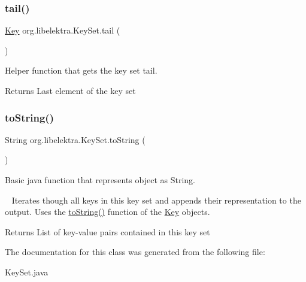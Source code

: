 \subsubsection{\texorpdfstring{tail()}{tail()}}
{\footnotesize\ttfamily \hyperlink{classorg_1_1libelektra_1_1Key}{Key} org.\+libelektra.\+Key\+Set.\+tail (\begin{DoxyParamCaption}{ }\end{DoxyParamCaption})\hspace{0.3cm}{\ttfamily [inline]}}



Helper function that gets the key set tail. 

\begin{DoxyReturn}{Returns}
Last element of the key set 
\end{DoxyReturn}
\mbox{\label{classorg_1_1libelektra_1_1KeySet_a9c1e2918acce8c7cda5be406989c87af}} 
\subsubsection{\texorpdfstring{to\+String()}{toString()}}
{\footnotesize\ttfamily String org.\+libelektra.\+Key\+Set.\+to\+String (\begin{DoxyParamCaption}{ }\end{DoxyParamCaption})\hspace{0.3cm}{\ttfamily [inline]}}



Basic java function that represents object as String. 

~\newline
 Iterates though all keys in this key set and appends their representation to the output. Uses the \hyperlink{classorg_1_1libelektra_1_1KeySet_a9c1e2918acce8c7cda5be406989c87af}{to\+String()} function of the \hyperlink{classorg_1_1libelektra_1_1Key}{Key} objects.

\begin{DoxyReturn}{Returns}
List of key-\/value pairs contained in this key set 
\end{DoxyReturn}


The documentation for this class was generated from the following file\+:\begin{DoxyCompactItemize}
\item 
Key\+Set.\+java\end{DoxyCompactItemize}

